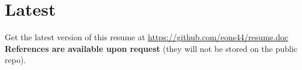 \documentclass[letterpaper]{twentysecondcv} %
\begin{document}







\section{Latest}

Get the latest version of this resume at \href{https://github.com/eons44/resume.doc}{https://github.com/eons44/resume.doc}\\
\textbf{References are available upon request} (they will not be stored on the public repo).
\end{document}
